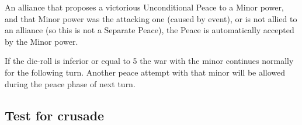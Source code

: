 An alliance that proposes a victorious Unconditional Peace to a Minor power,
and that Minor power was the attacking one (caused by event), or is not allied
to an alliance (so this is not a Separate Peace), the Peace is automatically
accepted by the Minor power.

If the die-roll is inferior or equal to 5 the war with the minor continues
normally for the following turn. Another peace attempt with that minor will be
allowed during the peace phase of next turn.

\subsection{Test for crusade}\label{chPeace:Crusade}

